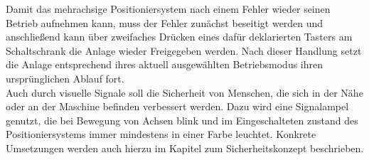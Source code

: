 \documentclass[../Bachelorarbeit.tex]{subfiles}
\begin{document}
Damit das mehrachsige Positioniersystem nach einem Fehler wieder seinen Betrieb aufnehmen kann, muss der Fehler zunächst beseitigt werden und anschließend kann über zweifaches Drücken eines dafür deklarierten Tasters am Schaltschrank die Anlage wieder Freigegeben werden. Nach dieser Handlung setzt die Anlage entsprechend ihres aktuell ausgewählten Betriebsmodus ihren ursprünglichen Ablauf fort.\\
Auch durch visuelle Signale soll die Sicherheit von Menschen, die sich in der Nähe oder an der Maschine befinden verbessert werden. Dazu wird eine Signalampel genutzt, die bei Bewegung von Achsen blink und im Eingeschalteten zustand des Positioniersystems immer mindestens in einer Farbe leuchtet. Konkrete Umsetzungen werden auch hierzu im Kapitel zum Sicherheitskonzept beschrieben.
\end{document}

